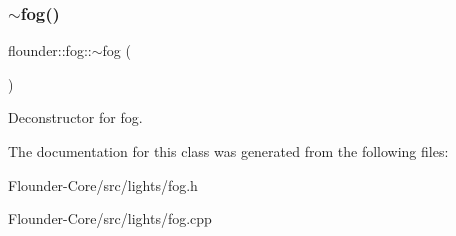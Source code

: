 \subsubsection{\texorpdfstring{$\sim$fog()}{~fog()}}
{\footnotesize\ttfamily flounder\+::fog\+::$\sim$fog (\begin{DoxyParamCaption}{ }\end{DoxyParamCaption})}



Deconstructor for fog. 



The documentation for this class was generated from the following files\+:\begin{DoxyCompactItemize}
\item 
Flounder-\/\+Core/src/lights/fog.\+h\item 
Flounder-\/\+Core/src/lights/fog.\+cpp\end{DoxyCompactItemize}
